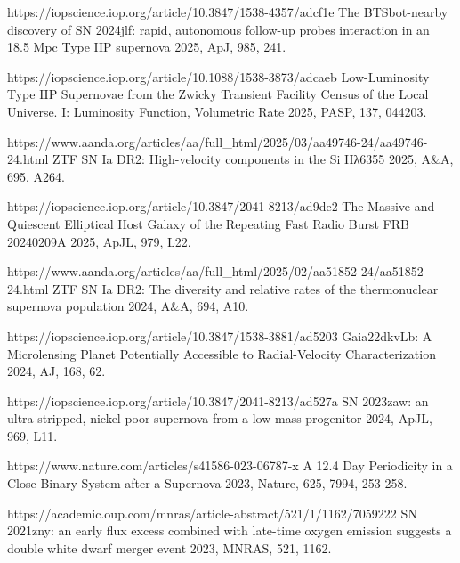 \begin{cvpubs}
\begin{cvpubitems}
{}
{https://iopscience.iop.org/article/10.3847/1538-4357/adcf1e}
{The BTSbot-nearby discovery of SN 2024jlf: rapid, autonomous follow-up probes interaction in an 18.5 Mpc Type IIP supernova}
{2025, ApJ, 985, 241.}

{}
{https://iopscience.iop.org/article/10.1088/1538-3873/adcaeb}
{Low-Luminosity Type IIP Supernovae from the Zwicky Transient Facility Census of the Local Universe. I: Luminosity Function, Volumetric Rate}
{2025, PASP, 137, 044203.}

{}
{https://www.aanda.org/articles/aa/full_html/2025/03/aa49746-24/aa49746-24.html}
{ZTF SN Ia DR2: High-velocity components in the Si IIλ6355}
{2025, A\&A, 695, A264.}

{}
{https://iopscience.iop.org/article/10.3847/2041-8213/ad9de2}
{The Massive and Quiescent Elliptical Host Galaxy of the Repeating Fast Radio Burst FRB 20240209A}
{2025, ApJL, 979, L22.}

{}
{https://www.aanda.org/articles/aa/full_html/2025/02/aa51852-24/aa51852-24.html}
{ZTF SN Ia DR2: The diversity and relative rates of the thermonuclear supernova population}
{2024, A\&A, 694, A10.}

{}
{https://iopscience.iop.org/article/10.3847/1538-3881/ad5203}
{Gaia22dkvLb: A Microlensing Planet Potentially Accessible to Radial-Velocity Characterization}
{2024, AJ, 168, 62.}

{}
{https://iopscience.iop.org/article/10.3847/2041-8213/ad527a}
{SN 2023zaw: an ultra-stripped, nickel-poor supernova from a low-mass progenitor}
{2024, ApJL, 969, L11.}

{}
{https://www.nature.com/articles/s41586-023-06787-x}
{A 12.4 Day Periodicity in a Close Binary System after a Supernova}
{2023, Nature, 625, 7994, 253-258.}

{}
{https://academic.oup.com/mnras/article-abstract/521/1/1162/7059222}
{SN\,2021zny: an early flux excess combined with late-time oxygen emission suggests a double white dwarf merger event}
{2023, MNRAS, 521, 1162.}

\end{cvpubitems}

\end{cvpubs}